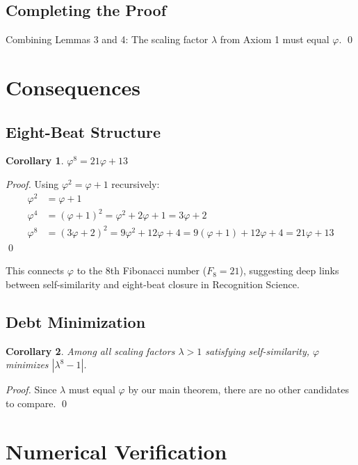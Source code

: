 \documentclass[11pt,a4paper]{article}
\newtheorem{corollary}{Corollary}
\begin{document}
\subsection{Completing the Proof}

Combining Lemmas 3 and 4: The scaling factor $\lambda$ from Axiom 1 must equal $\varphi$. \qed

\section{Consequences}

\subsection{Eight-Beat Structure}

\begin{corollary}
$\varphi^8 = 21\varphi + 13$
\end{corollary}

\begin{proof}
Using $\varphi^2 = \varphi + 1$ recursively:
\begin{align}
\varphi^2 &= \varphi + 1\\
\varphi^4 &= (\varphi + 1)^2 = \varphi^2 + 2\varphi + 1 = 3\varphi + 2\\
\varphi^8 &= (3\varphi + 2)^2 = 9\varphi^2 + 12\varphi + 4 = 9(\varphi + 1) + 12\varphi + 4 = 21\varphi + 13
\end{align}
\qed
\end{proof}

This connects $\varphi$ to the 8th Fibonacci number ($F_8 = 21$), suggesting deep links between self-similarity and eight-beat closure in Recognition Science.

\subsection{Debt Minimization}

\begin{corollary}
Among all scaling factors $\lambda > 1$ satisfying self-similarity, $\varphi$ minimizes $|\lambda^8 - 1|$.
\end{corollary}

\begin{proof}
Since $\lambda$ must equal $\varphi$ by our main theorem, there are no other candidates to compare. \qed
\end{proof}

\section{Numerical Verification}
\end{document}
